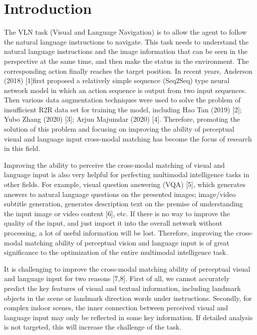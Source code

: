 \section{Introduction}
\label{intro}
	
The VLN task (Visual and Language Navigation) is to allow the agent to follow the natural language instructions to navigate. This task needs to understand the natural language instructions and the image information that can be seen in the perspective at the same time, and then make the status in the environment. The corresponding action finally reaches the target position. In recent years, Anderson (2018) [1]first proposed a relatively simple sequence (Seq2Seq) type neural network model in which an action sequence is output from two input sequences. Then various data augmentation techniques were used to solve the problem of insufficient R2R data set for training the model, including Hao Tan (2019) [2]; Yubo Zhang (2020) [3]; Arjun Majumdar (2020) [4]. Therefore, promoting the solution of this problem and focusing on improving the ability of perceptual visual and language input cross-modal matching has become the focus of research in this field.

Improving the ability to perceive the cross-modal matching of visual and language input is also very helpful for perfecting multimodal intelligence tasks in other fields. For example, visual question answering (VQA) [5], which generates answers to natural language questions on the presented images; image/video subtitle generation, generates description text on the premise of understanding the input image or video content [6], etc. If there is no way to improve the quality of the input, and just import it into the overall network without processing, a lot of useful information will be lost. Therefore, improving the cross-modal matching ability of perceptual vision and language input is of great significance to the optimization of the entire multimodal intelligence task.

It is challenging to improve the cross-modal matching ability of perceptual visual and language input for two reasons [7,8]. First of all, we cannot accurately predict the key features of visual and textual information, including landmark objects in the scene or landmark direction words under instructions. Secondly, for complex indoor scenes, the inner connection between perceived visual and language input may only be reflected in some key information. If detailed analysis is not targeted, this will increase the challenge of the task.
	
